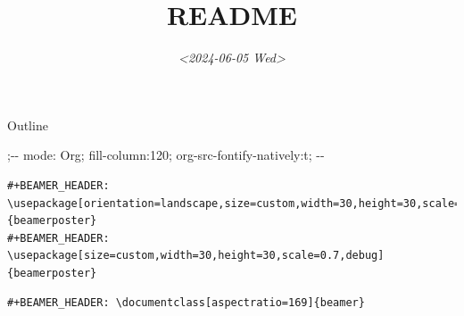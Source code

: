 \documentclass[presentation]{beamer}
\date{\textit{<2024-06-05 Wed>}}
\title{README}
\begin{document}
\maketitle
\begin{frame}{Outline}
\tableofcontents
\end{frame}

;-\alert{- mode: Org; fill-column:120; org-src-fontify-natively:t; -}-
\begin{verbatim}
#+BEAMER_HEADER: \usepackage[orientation=landscape,size=custom,width=30,height=30,scale=0.7,debug]{beamerposter}
#+BEAMER_HEADER: \usepackage[size=custom,width=30,height=30,scale=0.7,debug]{beamerposter}
\end{verbatim}


\begin{verbatim}
#+BEAMER_HEADER: \documentclass[aspectratio=169]{beamer}
\end{verbatim}
\end{document}
